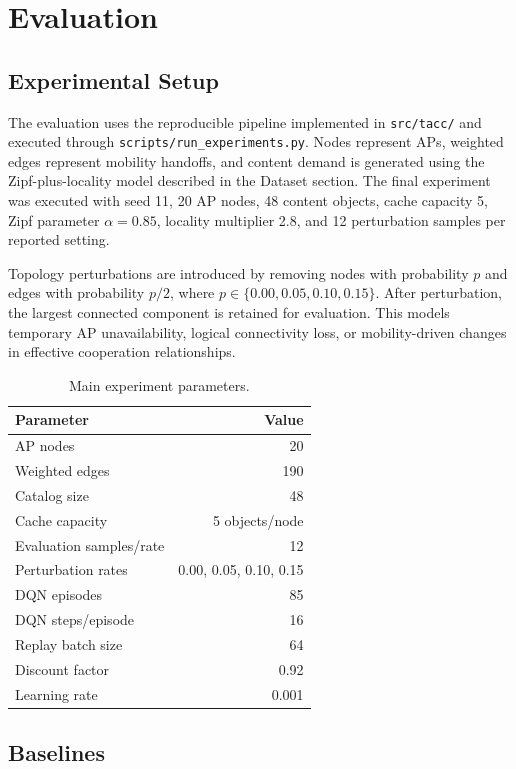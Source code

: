 \section{Evaluation}

\subsection{Experimental Setup}

The evaluation uses the reproducible pipeline implemented in \texttt{src/tacc/} and executed through \texttt{scripts/run\_experiments.py}. Nodes represent APs, weighted edges represent mobility handoffs, and content demand is generated using the Zipf-plus-locality model described in the Dataset section. The final experiment was executed with seed 11, 20 AP nodes, 48 content objects, cache capacity 5, Zipf parameter \(\alpha=0.85\), locality multiplier 2.8, and 12 perturbation samples per reported setting.

Topology perturbations are introduced by removing nodes with probability \(p\) and edges with probability \(p/2\), where \(p \in \{0.00,0.05,0.10,0.15\}\). After perturbation, the largest connected component is retained for evaluation. This models temporary AP unavailability, logical connectivity loss, or mobility-driven changes in effective cooperation relationships.

\begin{table}[t]
\centering
\caption{Main experiment parameters.}
\label{tab:parameters}
\begin{tabular}{lr}
\toprule
Parameter & Value \\
\midrule
AP nodes & 20 \\
Weighted edges & 190 \\
Catalog size & 48 \\
Cache capacity & 5 objects/node \\
Evaluation samples/rate & 12 \\
Perturbation rates & 0.00, 0.05, 0.10, 0.15 \\
DQN episodes & 85 \\
DQN steps/episode & 16 \\
Replay batch size & 64 \\
Discount factor & 0.92 \\
Learning rate & 0.001 \\
\bottomrule
\end{tabular}
\end{table}

\subsection{Baselines}

